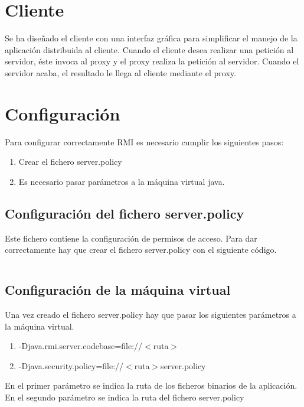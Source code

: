 \section{Cliente}
Se ha diseñado el cliente con una interfaz gráfica para simplificar el manejo de la aplicación distribuida al cliente. Cuando el cliente desea realizar una petición al servidor, éste invoca al proxy y el proxy realiza la petición al servidor. Cuando el servidor acaba, el resultado le llega al cliente mediante el proxy.

\section{Configuración}
Para configurar correctamente RMI es necesario cumplir los siguientes pasos:
\begin{enumerate}
	\item Crear el fichero server.policy
	\item Es necesario pasar parámetros a la máquina virtual java.
\end{enumerate}
\subsection{Configuración del fichero server.policy}
Este fichero contiene la configuración de permisos de acceso. Para dar correctamente hay que crear el fichero server.policy con el siguiente código.\\
\inputminted[bgcolor=claro]{RobotFramework}{/home/juan/IdeaProjects/ficherormi/target/classes/server.policy}
\subsection{Configuración de la máquina virtual}
Una vez creado el fichero server.policy hay que pasar los siguientes parámetros a la máquina virtual.
\begin{enumerate}
	\item -Djava.rmi.server.codebase=file://$<$ruta$>$ 
	\item -Djava.security.policy=file://$<$ruta$>$server.policy
\end{enumerate}
En el primer parámetro se indica la ruta de los ficheros binarios de la aplicación. En el segundo parámetro se indica la ruta del fichero server.policy
